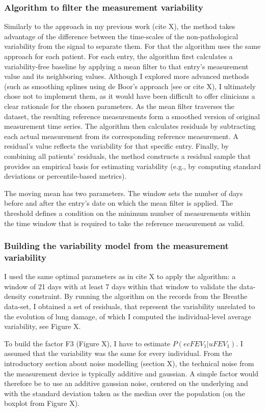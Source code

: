 \subsubsection{Algorithm to filter the measurement variability}
Similarly to the approach in my previous work (cite X), the method takes advantage of the difference between the time-scales of the non-pathological variability from the signal to separate them. For that the algorithm uses the same approach for each patient.
For each entry, the algorithm first calculates a variability-free baseline by applying a mean filter to that entry's measurement value and its neighboring values. Although I explored more advanced methods (such as smoothing splines using de Boor's approach [see \cite{imoto_2003} or cite X), I ultimately chose not to implement them, as it would have been difficult to offer clinicians a clear rationale for the chosen parameters.  As the mean filter traverses the dataset, the resulting reference measurements form a smoothed version of original measurement time series. The algorithm then calculates residuals by subtracting each actual measurement from its corresponding reference measurement. A residual's value reflects the variability for that specific entry. Finally, by combining all patients' residuals, the method constructs a residual sample that provides an empirical basis for estimating \F variability (e.g., by computing standard deviations or percentile-based metrics).

The moving mean has two parameters. The window sets the number of days before and after the entry's date on which the mean filter is applied. The threshold defines a condition on the minimum number of measurements within the time window that is required to take the reference measurement as valid.

\subsubsection{Building the variability model from the measurement variability}
I used the same optimal parameters as in cite X to apply the algorithm: a window of 21 days with at least 7 days within that window to validate the data-density constraint. By running the algorithm on the \F records from the Breathe data-set, I obtained a set of residuals, that represent the variability unrelated to the evolution of lung damage, of which I computed the individual-level average variability, see Figure X.

To build the factor F3 (Figure X), I have to estimate $P(ecF\!EV_1 | uF\!EV_1)$. I assumed that the variability was the same for every individual. 
From the introductory section about noise modelling (section X), the technical noise from the measurement device is typically additive and gaussian. A simple factor would therefore be to use an additive gaussian noise, centered on the underlying \F and with the standard deviation taken as the median over the population (on the boxplot from Figure X). 

